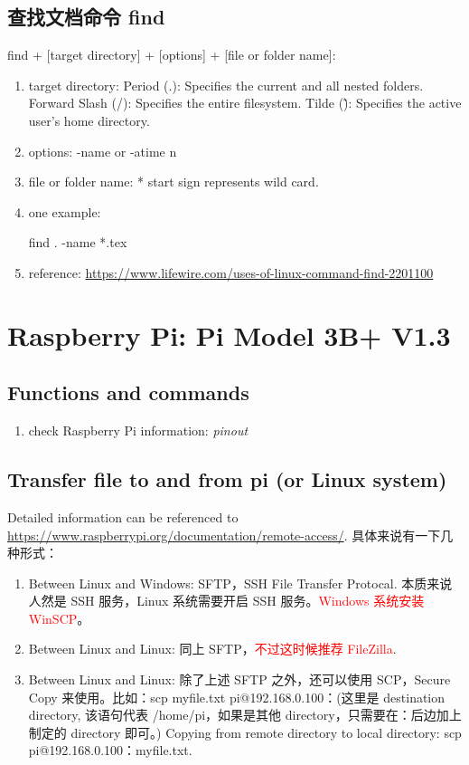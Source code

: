 \documentclass[UTF8,fancyhdr,a4paper]{ctexart}
\begin{document}
\subsection{查找文档命令 find}

find + [target directory] + [options] + [file or folder name]:
\begin{enumerate}
\item
target directory:
Period (.): Specifies the current and all nested folders.
Forward Slash (/): Specifies the entire filesystem.
Tilde (\~): Specifies the active user's home directory.
\item
options:
-name or -atime n
\item
file or folder name:
* start sign represents wild card.
\item
one example:

find . -name *.tex
\item
reference:
\url	{https://www.lifewire.com/uses-of-linux-command-find-2201100}


\end{enumerate}



\newpage
\section{Raspberry Pi: Pi Model 3B+ V1.3}
\subsection{Functions and commands}
\begin{enumerate}
\item check Raspberry Pi information: \textit{pinout}
\end{enumerate}
\subsection{Transfer file to and from pi (or Linux system)}
Detailed information can be referenced to \url{https://www.raspberrypi.org/documentation/remote-access/}. 具体来说有一下几种形式：
\begin{enumerate}
\item Between Linux and Windows: SFTP，SSH File Transfer Protocal. 本质来说人然是 SSH 服务，Linux 系统需要开启 SSH 服务。\textcolor{red}{Windows 系统安装 WinSCP}。
\item Between Linux and Linux: 同上 SFTP，\textcolor{red}{不过这时候推荐 FileZilla}.
\item Between Linux and Linux: 除了上述 SFTP 之外，还可以使用 SCP，Secure Copy 来使用。比如：scp myfile.txt pi@192.168.0.100：(这里是 destination directory, 该语句代表 /home/pi，如果是其他 directory，只需要在：后边加上制定的 directory 即可。) Copying from remote directory to local directory: scp pi@192.168.0.100：myfile.txt. 


\end{enumerate}
\end{document}
